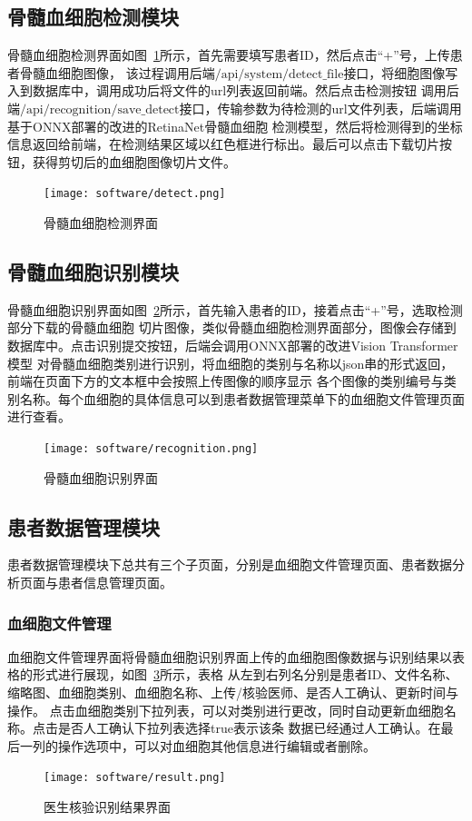\subsection{骨髓血细胞检测模块}
骨髓血细胞检测界面如图~\ref{fig:interface_detect}所示，首先需要填写患者ID，然后点击“+”号，上传患者骨髓血细胞图像，
该过程调用后端$\text{/api/system/detect\_file}$接口，将细胞图像写入到数据库中，调用成功后将文件的url列表返回前端。然后点击检测按钮
调用后端$\text{/api/recognition/save\_detect}$接口，传输参数为待检测的url文件列表，后端调用基于ONNX部署的改进的RetinaNet骨髓血细胞
检测模型，然后将检测得到的坐标信息返回给前端，在检测结果区域以红色框进行标出。最后可以点击下载切片按钮，获得剪切后的血细胞图像切片文件。
\begin{figure}[htbp]                     
  \centering                      
  \texttt{[image: software/detect.png]}                      
  \caption{骨髓血细胞检测界面}                      
  \label{fig:interface_detect}       
\end{figure}
\subsection{骨髓血细胞识别模块}
骨髓血细胞识别界面如图~\ref{fig:interface_recog}所示，首先输入患者的ID，接着点击“+”号，选取检测部分下载的骨髓血细胞
切片图像，类似骨髓血细胞检测界面部分，图像会存储到数据库中。点击识别提交按钮，后端会调用ONNX部署的改进Vision Transformer模型
对骨髓血细胞类别进行识别，将血细胞的类别与名称以json串的形式返回，前端在页面下方的文本框中会按照上传图像的顺序显示
各个图像的类别编号与类别名称。每个血细胞的具体信息可以到患者数据管理菜单下的血细胞文件管理页面进行查看。
\begin{figure}[htbp]                     
  \centering                      
  \texttt{[image: software/recognition.png]}                      
  \caption{骨髓血细胞识别界面}                      
  \label{fig:interface_recog}       
\end{figure}
\subsection{患者数据管理模块}
患者数据管理模块下总共有三个子页面，分别是血细胞文件管理页面、患者数据分析页面与患者信息管理页面。
\subsubsection{血细胞文件管理}
血细胞文件管理界面将骨髓血细胞识别界面上传的血细胞图像数据与识别结果以表格的形式进行展现，如图~\ref{fig:interface_result}所示，表格
从左到右列名分别是患者ID、文件名称、缩略图、血细胞类别、血细胞名称、上传/核验医师、是否人工确认、更新时间与操作。
点击血细胞类别下拉列表，可以对类别进行更改，同时自动更新血细胞名称。点击是否人工确认下拉列表选择true表示该条
数据已经通过人工确认。在最后一列的操作选项中，可以对血细胞其他信息进行编辑或者删除。
\begin{figure}[htbp]                     
  \centering                      
  \texttt{[image: software/result.png]}                      
  \caption{医生核验识别结果界面}                      
  \label{fig:interface_result}       
\end{figure}
